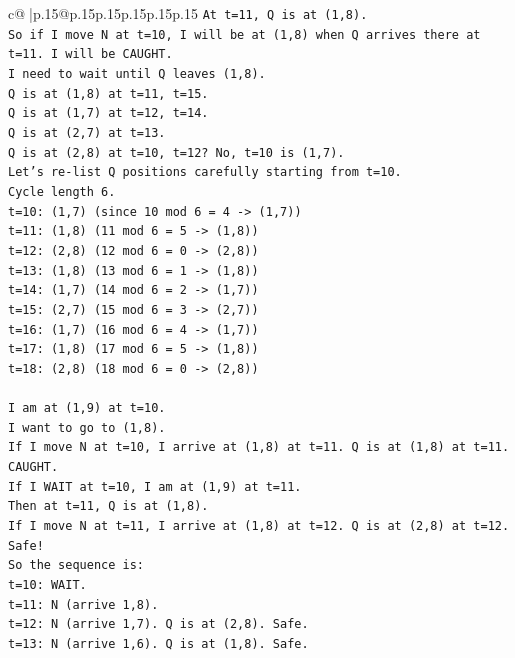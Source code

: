 \documentclass{article}
\begin{document}
{\begin{supertabular}{c@{$\;$}|p{.15\linewidth}@{}p{.15\linewidth}p{.15\linewidth}p{.15\linewidth}p{.15\linewidth}p{.15\linewidth}}
{{{\texttt{At t=11, Q is at (1,8).} \\
\texttt{So if I move N at t=10, I will be at (1,8) when Q arrives there at t=11. I will be CAUGHT.} \\
\texttt{I need to wait until Q leaves (1,8).} \\
\texttt{Q is at (1,8) at t=11, t=15.} \\
\texttt{Q is at (1,7) at t=12, t=14.} \\
\texttt{Q is at (2,7) at t=13.} \\
\texttt{Q is at (2,8) at t=10, t=12? No, t=10 is (1,7).} \\
\texttt{Let's re{-}list Q positions carefully starting from t=10.} \\
\texttt{Cycle length 6.} \\
\texttt{t=10: (1,7) (since 10 mod 6 = 4 {-}> (1,7))} \\
\texttt{t=11: (1,8) (11 mod 6 = 5 {-}> (1,8))} \\
\texttt{t=12: (2,8) (12 mod 6 = 0 {-}> (2,8))} \\
\texttt{t=13: (1,8) (13 mod 6 = 1 {-}> (1,8))} \\
\texttt{t=14: (1,7) (14 mod 6 = 2 {-}> (1,7))} \\
\texttt{t=15: (2,7) (15 mod 6 = 3 {-}> (2,7))} \\
\texttt{t=16: (1,7) (16 mod 6 = 4 {-}> (1,7))} \\
\texttt{t=17: (1,8) (17 mod 6 = 5 {-}> (1,8))} \\
\texttt{t=18: (2,8) (18 mod 6 = 0 {-}> (2,8))} \\
\\ 
\texttt{I am at (1,9) at t=10.} \\
\texttt{I want to go to (1,8).} \\
\texttt{If I move N at t=10, I arrive at (1,8) at t=11. Q is at (1,8) at t=11. CAUGHT.} \\
\texttt{If I WAIT at t=10, I am at (1,9) at t=11.} \\
\texttt{Then at t=11, Q is at (1,8).} \\
\texttt{If I move N at t=11, I arrive at (1,8) at t=12. Q is at (2,8) at t=12. Safe!} \\
\texttt{So the sequence is:} \\
\texttt{t=10: WAIT.} \\
\texttt{t=11: N (arrive 1,8).} \\
\texttt{t=12: N (arrive 1,7). Q is at (2,8). Safe.} \\
\texttt{t=13: N (arrive 1,6). Q is at (1,8). Safe.} \\
}}}
\end{supertabular}}
\end{document}
